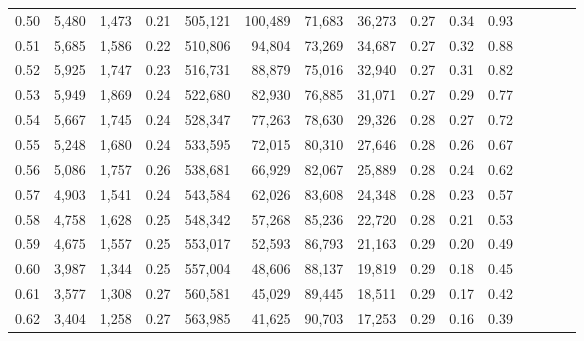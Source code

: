 \begin{tabular}{rrrcrrrrrrrrrrr}
0.50 &   5,480 &  1,473 &                                       0.21 &  505,121 &  100,489 &   71,683 &   36,273 &  0.27 &  0.34 &                         0.93 \\
0.51 &   5,685 &  1,586 &                                       0.22 &  510,806 &   94,804 &   73,269 &   34,687 &  0.27 &  0.32 &                         0.88 \\
0.52 &   5,925 &  1,747 &                                       0.23 &  516,731 &   88,879 &   75,016 &   32,940 &  0.27 &  0.31 &                         0.82 \\
0.53 &   5,949 &  1,869 &                                       0.24 &  522,680 &   82,930 &   76,885 &   31,071 &  0.27 &  0.29 &                         0.77 \\
0.54 &   5,667 &  1,745 &                                       0.24 &  528,347 &   77,263 &   78,630 &   29,326 &  0.28 &  0.27 &                         0.72 \\
0.55 &   5,248 &  1,680 &                                       0.24 &  533,595 &   72,015 &   80,310 &   27,646 &  0.28 &  0.26 &                         0.67 \\
0.56 &   5,086 &  1,757 &                                       0.26 &  538,681 &   66,929 &   82,067 &   25,889 &  0.28 &  0.24 &                         0.62 \\
0.57 &   4,903 &  1,541 &                                       0.24 &  543,584 &   62,026 &   83,608 &   24,348 &  0.28 &  0.23 &                         0.57 \\
0.58 &   4,758 &  1,628 &                                       0.25 &  548,342 &   57,268 &   85,236 &   22,720 &  0.28 &  0.21 &                         0.53 \\
0.59 &   4,675 &  1,557 &                                       0.25 &  553,017 &   52,593 &   86,793 &   21,163 &  0.29 &  0.20 &                         0.49 \\
0.60 &   3,987 &  1,344 &                                       0.25 &  557,004 &   48,606 &   88,137 &   19,819 &  0.29 &  0.18 &                         0.45 \\
0.61 &   3,577 &  1,308 &                                       0.27 &  560,581 &   45,029 &   89,445 &   18,511 &  0.29 &  0.17 &                         0.42 \\
0.62 &   3,404 &  1,258 &                                       0.27 &  563,985 &   41,625 &   90,703 &   17,253 &  0.29 &  0.16 &                         0.39 \\

\end{tabular}

